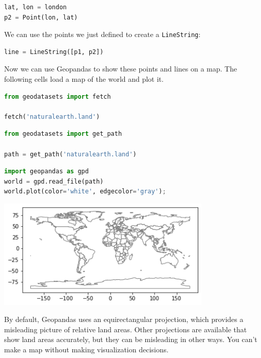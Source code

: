 \begin{lstlisting}[language=Python,style=source]
lat, lon = london
p2 = Point(lon, lat)
\end{lstlisting}

We can use the points we just defined to create a
\passthrough{\lstinline!LineString!}:

\begin{lstlisting}[language=Python,style=source]
line = LineString([p1, p2])
\end{lstlisting}

Now we can use Geopandas to show these points and lines on a map. The
following cells load a map of the world and plot it.

\begin{lstlisting}[language=Python,style=source]
from geodatasets import fetch

fetch('naturalearth.land')
\end{lstlisting}

\begin{lstlisting}[language=Python,style=source]
from geodatasets import get_path

path = get_path('naturalearth.land')
\end{lstlisting}

\begin{lstlisting}[language=Python,style=source]
import geopandas as gpd
world = gpd.read_file(path)
world.plot(color='white', edgecolor='gray');
\end{lstlisting}

\begin{center}
\includegraphics[width=4in]{chapters/02_times_files/02_times_127_0.png}
\end{center}

By default, Geopandas uses an equirectangular projection, which provides
a misleading picture of relative land areas. Other projections are
available that show land areas accurately, but they can be misleading in
other ways. You can't make a map without making visualization decisions.

